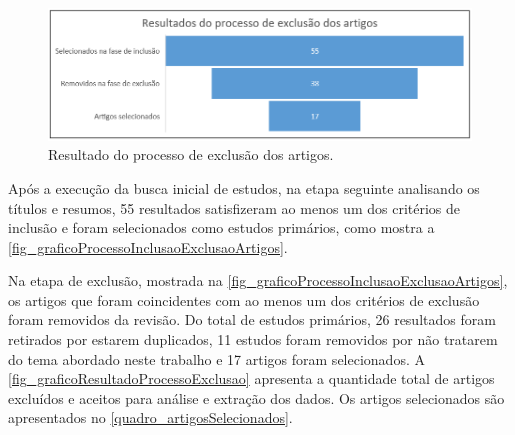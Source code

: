 \begin{figure}[htb]
	\caption{\label{fig_graficoResultadoProcessoExclusao}Resultado do processo de exclusão dos artigos.}
	\begin{center}
	    \includegraphics[scale=0.6]{Imagens/grafico - resultado da fase de exclusao dos artigos.png}
	\end{center}
\end{figure}

Após a execução da busca inicial de estudos, na etapa seguinte analisando os títulos e resumos, 55 resultados satisfizeram ao menos um dos critérios de inclusão e foram selecionados como estudos primários, como mostra a \autoref{fig_graficoProcessoInclusaoExclusaoArtigos}. 
\newline
\newline
\newline

Na etapa de exclusão, mostrada na \autoref{fig_graficoProcessoInclusaoExclusaoArtigos}, os artigos que foram coincidentes com ao menos um dos critérios de exclusão foram removidos da revisão. Do total de estudos primários, 26 resultados foram retirados por estarem duplicados, 11 estudos foram removidos por não tratarem do tema abordado neste trabalho e 17 artigos foram selecionados. A \autoref{fig_graficoResultadoProcessoExclusao} apresenta a quantidade total de artigos excluídos e aceitos para análise e extração dos dados. Os artigos selecionados são apresentados no \autoref{quadro_artigosSelecionados}.

